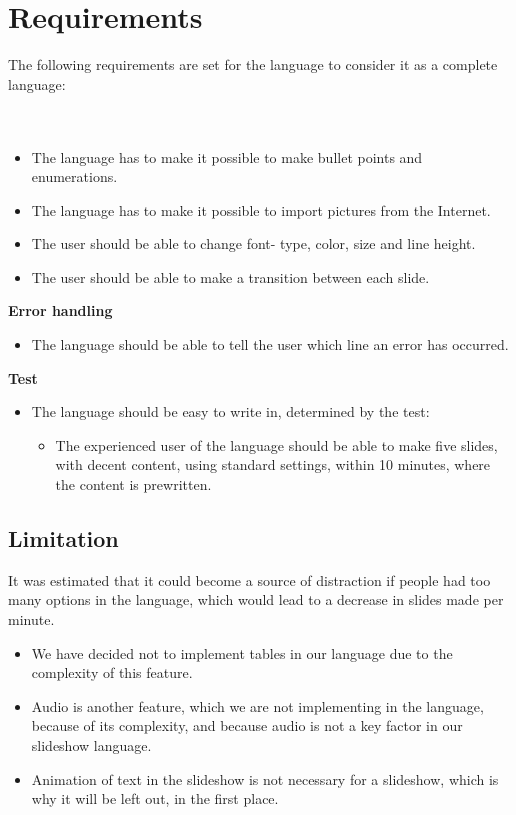 \section{Requirements}
\label{LanguageRequirements}
The following requirements are set for the language to consider it as a complete language:
\\ \\
 \\
\begin{itemize}
\item The language has to make it possible to make bullet points and enumerations.
\item The language has to make it possible to import pictures from the Internet.
\item The user should be able to change font- type, color, size and line height.
\item The user should be able to make a transition between each slide. 
\end{itemize}
\textbf{Error handling}\\
\begin{itemize}
\item The language should be able to tell the user which line an error has occurred. 
\end{itemize}
\textbf{Test}\\
\begin{itemize}
\item The language should be easy to write in, determined by the test:
\begin{itemize}
\item The experienced user of the language should be able to make five slides, with decent content, using standard settings, within 10 minutes, where the content is prewritten.
\end{itemize}
\end{itemize}

\subsection*{Limitation}
It was estimated that it could become a source of distraction if people had too many options in the language, which would lead to a decrease in slides made per minute.

\begin{itemize}
	\item We have decided not to implement tables in our language due to the complexity of this feature.
	\item Audio is another feature, which we are not implementing in the language, because of its complexity, and because audio is not a key factor in our slideshow language.
	\item Animation of text in the slideshow is not necessary for a slideshow, which is why it will be left out, in the first place.
\end{itemize}